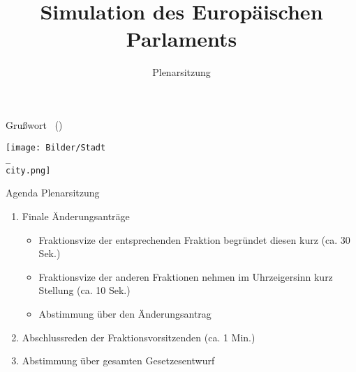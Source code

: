 \documentclass{beamer}
\title{Simulation des Europäischen Parlaments}
\subtitle{Plenarsitzung}
\date{\datum}
\begin{document}
\frame{\titlepage}

\begin{frame}{Grußwort \stadtvertreter\ (\stadtvertreterOffice)}
\vspace{-1.5cm}
    \begin{center}
        \texttt{[image: Bilder/Stadt\\\_\\city.png]}
    \end{center}
\end{frame}

\begin{frame}{Agenda Plenarsitzung}
\vspace{-1.5cm}
    \begin{enumerate}
        \item Finale Änderungsanträge
        \begin{itemize}
            \item Fraktionsvize der entsprechenden Fraktion begründet diesen kurz (ca. 30 Sek.)
            \item Fraktionsvize der anderen Fraktionen nehmen im Uhrzeigersinn kurz Stellung (ca. 10 Sek.)
            \item Abstimmung über den Änderungsantrag
        \end{itemize}
        \item Abschlussreden der Fraktionsvorsitzenden (ca. 1 Min.)
        \item Abstimmung über gesamten Gesetzesentwurf
    \end{enumerate}
\end{frame}
\end{document}
